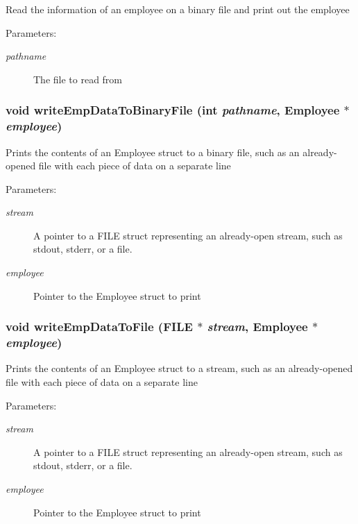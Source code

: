 Read the information of an employee on a binary file and print out the employee \begin{Desc}
\item[Parameters:]
\begin{description}
\item[{\em pathname}]The file to read from \end{description}
\end{Desc}
\subsubsection{\setlength{\rightskip}{0pt plus 5cm}void write\-Emp\-Data\-To\-Binary\-File (int {\em pathname}, \bf{Employee} $\ast$ {\em employee})}\label{struct_8h_58744171738d60fc2d2f0cfda2350f12}


Prints the contents of an Employee struct to a binary file, such as an already-opened file with each piece of data on a separate line \begin{Desc}
\item[Parameters:]
\begin{description}
\item[{\em stream}]A pointer to a FILE struct representing an already-open stream, such as stdout, stderr, or a file. \item[{\em employee}]Pointer to the Employee struct to print \end{description}
\end{Desc}
\subsubsection{\setlength{\rightskip}{0pt plus 5cm}void write\-Emp\-Data\-To\-File (FILE $\ast$ {\em stream}, \bf{Employee} $\ast$ {\em employee})}\label{struct_8h_d234119b28ad4ab9888a754b8b469994}


Prints the contents of an Employee struct to a stream, such as an already-opened file with each piece of data on a separate line \begin{Desc}
\item[Parameters:]
\begin{description}
\item[{\em stream}]A pointer to a FILE struct representing an already-open stream, such as stdout, stderr, or a file. \item[{\em employee}]Pointer to the Employee struct to print \end{description}
\end{Desc}
